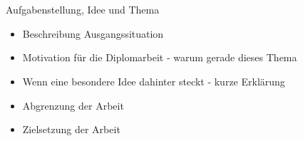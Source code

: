 \chapter{\docname}
\label{\docname}

\color{red}
Aufgabenstellung, Idee und Thema
\begin{itemize}
	\item Beschreibung Ausgangssituation
	\item Motivation für die Diplomarbeit - warum gerade dieses Thema
	\item Wenn eine besondere Idee dahinter steckt - kurze Erklärung 
	\item Abgrenzung der Arbeit
	\item Zielsetzung der Arbeit
\end{itemize}

\color{black}
